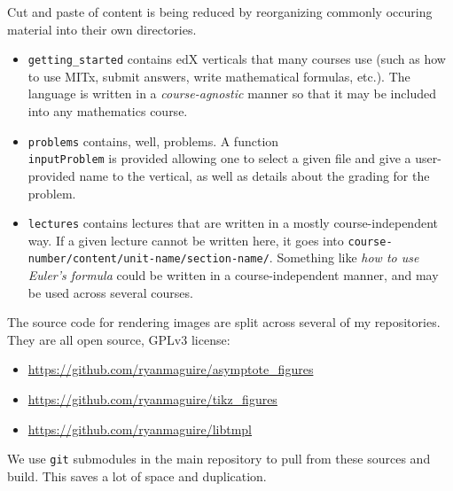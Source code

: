 \documentclass{beamer}
\begin{document}
    \begin{frame}
        Cut and paste of content is being reduced by reorganizing
        commonly occuring material into their own directories.
        \begin{itemize}
            \item
                \texttt{getting\_started} contains edX verticals that
                many courses use (such as how to use MITx, submit answers,
                write mathematical formulas, etc.). The language is written in
                a \textit{course-agnostic} manner so that it may be included
                into any mathematics course.
            \item
                \texttt{problems} contains, well, problems.
                A function \texttt{\\inputProblem} is provided allowing one
                to select a given file and give a user-provided name to the
                vertical, as well as details about the grading for the problem.
            \item
                \texttt{lectures} contains lectures that are written in
                a mostly course-independent way. If a given lecture cannot be
                written here, it goes into
                \texttt{course-number/content/unit-name/section-name/}.
                Something like \textit{how to use Euler's formula} could
                be written in a course-independent manner, and may be used
                across several courses.
        \end{itemize}
    \end{frame}
    \begin{frame}
        The source code for rendering images are split across several of
        my repositories. They are all open source, GPLv3 license:
        \begin{itemize}
            \item
                \url{https://github.com/ryanmaguire/asymptote_figures}
            \item
                \url{https://github.com/ryanmaguire/tikz_figures}
            \item
                \url{https://github.com/ryanmaguire/libtmpl}
        \end{itemize}
        We use \texttt{git} submodules in the main repository to pull from
        these sources and build. This saves a lot of space and duplication.
    \end{frame}
\end{document}
